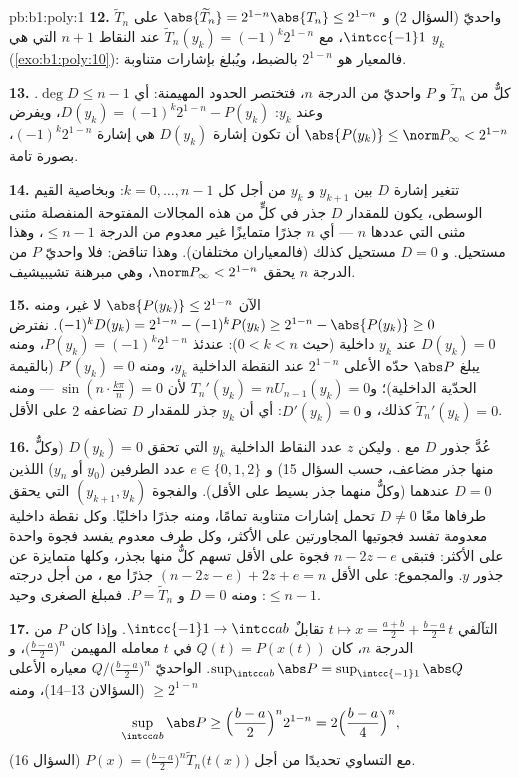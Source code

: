 \begin{solution}{pb:b1:poly:1}
\textbf{12.}  $\widetilde T_n$ واحديّ (السؤال 2) و
$\abs{\widetilde T_n} = 2^{1-n}\abs{T_n} \leq 2^{1-n}$ على
$\intcc{-1}1$، مع $\widetilde T_n(y_k) = (-1)^k2^{1-n}$ عند
النقاط $n + 1$ التي هي $y_k$ (\cref{exo:b1:poly:10}): فالمعيار هو
$2^{1-n}$ بالضبط، ويُبلغ بإشارات متناوبة.

\textbf{13.} كلٌّ من $\widetilde T_n$ و $P$ واحديّ من الدرجة
$n$، فتختصر الحدود المهيمنة: أي $\deg D \leq n - 1$. وعند $y_k$:
$D(y_k) = (-1)^k2^{1-n} - P(y_k)$، ويفرض $\abs{P(y_k)} \leq \norm
P_\infty < 2^{1-n}$ أن تكون إشارة $D(y_k)$ هي إشارة
$(-1)^k2^{1-n}$، بصورة تامة.

\textbf{14.} تتغير إشارة $D$ بين $y_{k+1}$ و $y_k$ من أجل كل
$k = 0, \dots, n-1$: وبخاصية القيم الوسطى، يكون للمقدار $D$
جذر في كلٍّ من هذه المجالات المفتوحة المنفصلة مثنى مثنى التي عددها $n$ --- أي $n$
جذرًا متمايزًا  غير معدوم من الدرجة $\leq n - 1$،
وهذا مستحيل. و $D = 0$ مستحيل كذلك (فالمعياران مختلفان).
وهذا تناقض: فلا  واحديّ $P$ من الدرجة $n$ يحقق $\norm P_\infty <
2^{1-n}$، وهي مبرهنة تشيبيشيف.

\textbf{15.} الآن $\abs{P(y_k)} \leq 2^{1-n}$ لا غير، ومنه $(-1)^k
D(y_k) = 2^{1-n} - (-1)^kP(y_k) \geq 2^{1-n} - \abs{P(y_k)} \geq
0$. نفترض $D(y_k) = 0$ عند $y_k$ داخلية (حيث $0 < k < n$): عندئذ
$P(y_k) = (-1)^k2^{1-n}$، ومنه يبلغ $\abs P$ حدّه الأعلى
$2^{1-n}$ عند النقطة الداخلية $y_k$، ومنه $P'(y_k) = 0$
(بالقيمة الحدّية الداخلية)؛ و$T_n'(y_k) = nU_{n-1}(y_k) = 0$ لأن
$\sin(n\cdot\frac{k\pi}n) = 0$ --- ومنه $\widetilde T_n'(y_k) = 0$
كذلك، و $D'(y_k) = 0$: أي أن $y_k$ جذر للمقدار $D$ تضاعفه
$2$ على الأقل.

\textbf{16.} عُدَّ جذور $D$ مع . وليكن $z$
عدد النقاط الداخلية $y_k$ التي تحقق $D(y_k) = 0$ (وكلٌّ منها جذر
مضاعف، حسب السؤال 15) و $e \in \{0, 1, 2\}$ عدد
الطرفين ($y_0$ أو $y_n$) اللذين $D = 0$ عندهما (وكلٌّ منهما جذر بسيط
على الأقل). والفجوة $(y_{k+1}, y_k)$ التي يحقق طرفاها معًا $D
\neq 0$ تحمل إشارات متناوبة تمامًا، ومنه جذرًا
داخليًا. وكل نقطة داخلية معدومة تفسد فجوتيها
المجاورتين على الأكثر، وكل طرف معدوم يفسد فجوة واحدة على الأكثر: فتبقى
$n - 2z - e$ فجوة على الأقل تسهم كلٌّ منها بجذر، وكلها متمايزة
عن جذور $y$. والمجموع: على الأقل $(n - 2z - e) + 2z + e = n$
جذرًا مع ، من أجل  درجته $\leq n - 1$:
ومنه $D = 0$ و $P = \widetilde T_n$. فمبلغ الصغرى وحيد.

\textbf{17.}  التآلفي $t \mapsto x = \frac{a+b}2 +
\frac{b-a}2\,t$ تقابلٌ $\intcc{-1}1 \to \intcc ab$. وإذا كان $P$
 من الدرجة $n$، كان $Q(t) = P(x(t))$  في
$t$ معامله المهيمن $\bigl(\frac{b-a}2\bigr)^n$، و
$\sup_{\intcc ab}\abs P = \sup_{\intcc{-1}1}\abs Q$. 
الواحديّ $Q/\bigl(\frac{b-a}2\bigr)^n$ معياره الأعلى $\geq
2^{1-n}$ (السؤالان 13--14)، ومنه
\[
\sup_{\intcc ab}\abs P \geq \Bigl(\frac{b-a}2\Bigr)^n 2^{1-n}
= 2\Bigl(\frac{b-a}4\Bigr)^n ,
\]
مع التساوي تحديدًا من أجل $P(x) = \bigl(\frac{b-a}2\bigr)^n
\widetilde T_n\bigl(t(x)\bigr)$ (السؤال 16).


\end{solution}
